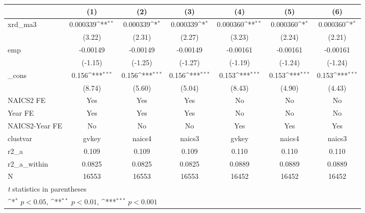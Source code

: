 {
\def\sym#1{\ifmmode^{#1}\else\(^{#1}\)\fi}
\begin{tabular}{l*{6}{c}}
\hline\hline
            &\multicolumn{1}{c}{(1)}         &\multicolumn{1}{c}{(2)}         &\multicolumn{1}{c}{(3)}         &\multicolumn{1}{c}{(4)}         &\multicolumn{1}{c}{(5)}         &\multicolumn{1}{c}{(6)}         \\
\hline
xrd\_ma3     &    0.000339\sym{**} &    0.000339\sym{*}  &    0.000339\sym{*}  &    0.000360\sym{**} &    0.000360\sym{*}  &    0.000360\sym{*}  \\
            &      (3.22)         &      (2.31)         &      (2.27)         &      (3.23)         &      (2.24)         &      (2.21)         \\
[1em]
emp         &    -0.00149         &    -0.00149         &    -0.00149         &    -0.00161         &    -0.00161         &    -0.00161         \\
            &     (-1.15)         &     (-1.25)         &     (-1.27)         &     (-1.19)         &     (-1.24)         &     (-1.24)         \\
[1em]
\_cons      &       0.156\sym{***}&       0.156\sym{***}&       0.156\sym{***}&       0.153\sym{***}&       0.153\sym{***}&       0.153\sym{***}\\
            &      (8.74)         &      (5.60)         &      (5.04)         &      (8.43)         &      (4.90)         &      (4.43)         \\
[1em]
NAICS2 FE   &         Yes         &         Yes         &         Yes         &          No         &          No         &          No         \\
[1em]
Year FE     &         Yes         &         Yes         &         Yes         &          No         &          No         &          No         \\
[1em]
NAICS2-Year FE&          No         &          No         &          No         &         Yes         &         Yes         &         Yes         \\
\hline
clustvar    &       gvkey         &      naics4         &      naics3         &       gvkey         &      naics4         &      naics3         \\
r2\_a        &       0.109         &       0.109         &       0.109         &       0.110         &       0.110         &       0.110         \\
r2\_a\_within &      0.0825         &      0.0825         &      0.0825         &      0.0889         &      0.0889         &      0.0889         \\
N           &       16553         &       16553         &       16553         &       16452         &       16452         &       16452         \\
\hline\hline
\multicolumn{7}{l}{\footnotesize \textit{t} statistics in parentheses}\\
\multicolumn{7}{l}{\footnotesize \sym{*} \(p<0.05\), \sym{**} \(p<0.01\), \sym{***} \(p<0.001\)}\\
\end{tabular}
}
